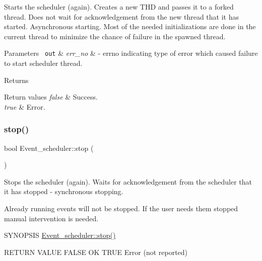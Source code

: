 Starts the scheduler (again). Creates a new T\+HD and passes it to a forked thread. Does not wait for acknowledgement from the new thread that it has started. Asynchronous starting. Most of the needed initializations are done in the current thread to minimize the chance of failure in the spawned thread.


\begin{DoxyParams}[1]{Parameters}
\mbox{\texttt{ out}}  & {\em err\+\_\+no} & -\/ errno indicating type of error which caused failure to start scheduler thread.\\
\hline
\end{DoxyParams}
\begin{DoxyReturn}{Returns}

\end{DoxyReturn}

\begin{DoxyRetVals}{Return values}
{\em false} & Success. \\
\hline
{\em true} & Error. \\
\hline
\end{DoxyRetVals}
\mbox{\label{group__Event__Scheduler_ga2efd565f1cc88f96232725ab8a1e36ae}} 
\subsubsection{\texorpdfstring{stop()}{stop()}}
{\footnotesize\ttfamily bool Event\+\_\+scheduler\+::stop (\begin{DoxyParamCaption}{ }\end{DoxyParamCaption})}

Stops the scheduler (again). Waits for acknowledgement from the scheduler that it has stopped -\/ synchronous stopping.

Already running events will not be stopped. If the user needs them stopped manual intervention is needed.

S\+Y\+N\+O\+P\+S\+IS \mbox{\hyperlink{group__Event__Scheduler_ga2efd565f1cc88f96232725ab8a1e36ae}{Event\+\_\+scheduler\+::stop()}}

R\+E\+T\+U\+RN V\+A\+L\+UE F\+A\+L\+SE OK T\+R\+UE Error (not reported) \mbox{\label{group__Event__Scheduler_ga2febaed952a7cc8253508b8ea0bc4516}} 

